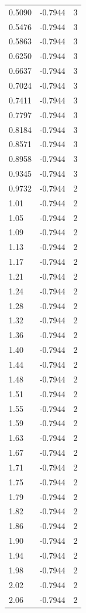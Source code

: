 \begin{longtable}{lrr}
  0.5090 & -0.7944 & 3 \\
  0.5476 & -0.7944 & 3 \\
  0.5863 & -0.7944 & 3 \\
  0.6250 & -0.7944 & 3 \\
  0.6637 & -0.7944 & 3 \\
  0.7024 & -0.7944 & 3 \\
  0.7411 & -0.7944 & 3 \\
  0.7797 & -0.7944 & 3 \\
  0.8184 & -0.7944 & 3 \\
  0.8571 & -0.7944 & 3 \\
  0.8958 & -0.7944 & 3 \\
  0.9345 & -0.7944 & 3 \\
  0.9732 & -0.7944 & 2 \\
  1.01 & -0.7944 & 2 \\
  1.05 & -0.7944 & 2 \\
  1.09 & -0.7944 & 2 \\
  1.13 & -0.7944 & 2 \\
  1.17 & -0.7944 & 2 \\
  1.21 & -0.7944 & 2 \\
  1.24 & -0.7944 & 2 \\
  1.28 & -0.7944 & 2 \\
  1.32 & -0.7944 & 2 \\
  1.36 & -0.7944 & 2 \\
  1.40 & -0.7944 & 2 \\
  1.44 & -0.7944 & 2 \\
  1.48 & -0.7944 & 2 \\
  1.51 & -0.7944 & 2 \\
  1.55 & -0.7944 & 2 \\
  1.59 & -0.7944 & 2 \\
  1.63 & -0.7944 & 2 \\
  1.67 & -0.7944 & 2 \\
  1.71 & -0.7944 & 2 \\
  1.75 & -0.7944 & 2 \\
  1.79 & -0.7944 & 2 \\
  1.82 & -0.7944 & 2 \\
  1.86 & -0.7944 & 2 \\
  1.90 & -0.7944 & 2 \\
  1.94 & -0.7944 & 2 \\
  1.98 & -0.7944 & 2 \\
  2.02 & -0.7944 & 2 \\
  2.06 & -0.7944 & 2 \\

\end{longtable}
